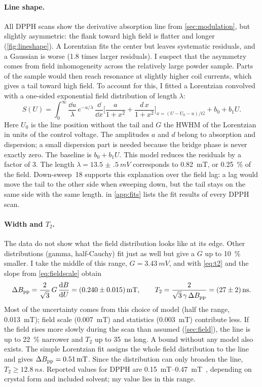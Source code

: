 \paragraph{Line shape.}
All DPPH scans show the derivative absorption line from \cref{sec:modulation}, but slightly asymmetric: the flank toward
high field is flatter and longer (\cref{fig:lineshape}). A Lorentzian fits the center but leaves systematic residuals,
and a Gaussian is worse (1.8 times larger residuals). I suspect that the asymmetry comes from field inhomogeneity
across the relatively large powder sample. Parts of the sample would then reach resonance at slightly higher coil
currents, which gives a tail toward high field. To account for this, I fitted a Lorentzian convolved with a one-sided
exponential field distribution of length $\lambda$:
\begin{equation}\label{eq:convolution}
  S(U)=\int_0^\infty\frac{\dd u}{\lambda}\,e^{-u/\lambda}\,
  \frac{\dd}{\dd x}\biggl[\frac{a}{1+x^2}+\frac{d\,x}{1+x^2}\biggr]_{x=(U-U_0-u)/G}+b_0+b_1U .
\end{equation}
Here $U_0$ is the line position without the tail and $G$ the HWHM of the Lorentzian in units of the control voltage. The
amplitudes $a$ and $d$ belong to absorption and dispersion; a small dispersion part is needed because the bridge phase is
never exactly zero. The baseline is $b_0+b_1U$. This model reduces the residuals by a factor of 3. The length
$\lambda=\qty{13.5(5)}{mV}$ corresponds to \qty{0.82}{mT}, or \qty{0.25}{\percent} of the field. Down-sweep~18 supports
this explanation over the field lag: a lag would move the tail to the other side when sweeping down, but the tail stays
on the same side with the same length.  in \cref{app:fits} lists the fit results
of every DPPH scan.

\paragraph{Width and \texorpdfstring{$T_2$}{T2}.}
The data do not show what the field distribution looks like at its edge. Other distributions (gamma, half-Cauchy) fit
just as well but give a $G$ up to \qty{10}{\percent} smaller. I take the middle of this range, $G=\qty{3.43}{mV}$, and
with \cref{eq:t2} and the slope from \cref{eq:fieldscale} obtain
\begin{equation}\label{eq:t2dpph}
  \Delta B_\mathrm{pp}=\frac{2}{\sqrt3}\,G\,\frac{\mathrm{d} B}{\mathrm{d} U}=\qty{0.240(15)}{mT},\qquad
  T_2=\frac{2}{\sqrt3\,\gamma\,\Delta B_\mathrm{pp}}=\qty{27(2)}{ns}.
\end{equation}
Most of the uncertainty comes from this choice of model (half the range, \qty{0.013}{mT}); field scale
(\qty{0.007}{mT}) and statistics (\qty{0.003}{mT}) contribute less. If the field rises more slowly during the scan than
assumed (\cref{sec:field}), the line is up to \qty{22}{\percent} narrower and $T_2$ up to \qty{35}{ns} long. A bound
without any model also exists. The simple Lorentzian fit assigns the whole field distribution to the line and gives
$\Delta B_\mathrm{pp}=\qty{0.51}{mT}$. Since the distribution can only broaden the line, $T_2\geq\qty{12.8}{ns}$. Reported values for
DPPH are \qtyrange{0.15}{0.47}{mT}~\cite{poole1996}, depending on crystal form and included solvent; my value lies in
this range.


